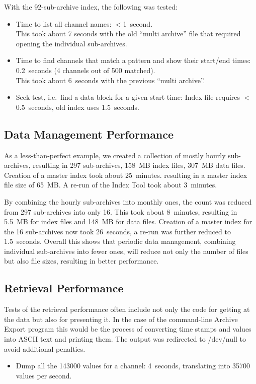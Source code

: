 \noindent With the 92-sub-archive index, the following was tested:
\begin{itemize}
\item Time to list all channel names: $<$1~second.\\
      This took about 7 seconds with the old ``multi archive'' file
      that required opening the individual sub-archives.
\item Time to find channels that match a pattern and show their
      start/end times: 0.2~seconds (4 channels out of 500 matched).\\
      This took about 6~seconds with the previous ``multi archive''.
\item Seek test, i.e.\ find a data block for a given start time:
      Index file requires $<$0.5~seconds, old index uses 1.5~seconds.
\end{itemize}

\subsection{Data Management Performance}
As a less-than-perfect example, we created a collection of mostly
hourly sub-archives, resulting in 297 sub-archives, 158~MB index
files, 307~MB data files.  Creation of a master index took about
25~minutes.  resulting in a master index file size of 65~MB.  A re-run
of the Index Tool took about 3~minutes.

By combining the hourly sub-archives into monthly ones, the count was
reduced from 297 sub-archives into only 16.  This took about
8~minutes, resulting in 5.5~MB for index files and 148~MB for data
files. Creation of a master index for the 16 sub-archives now took
26~seconds, a re-run was further reduced to 1.5~seconds.
Overall this shows that periodic data management, combining individual
sub-archives into fewer ones, will reduce not only the number of files
but also file sizes, resulting in better performance.

\subsection{Retrieval Performance}
Tests of the retrieval performance often include not only the
code for getting at the data but also for presenting it. In the
case of the command-line Archive Export program this would be the process
of converting time stamps and values into ASCII text and printing them.
The output was redirected to /dev/null to avoid additional penalties.

\begin{itemize}
\item Dump all the 143000 values for a channel: 4~seconds,
      translating into 35700 values per second.
\end{itemize}
